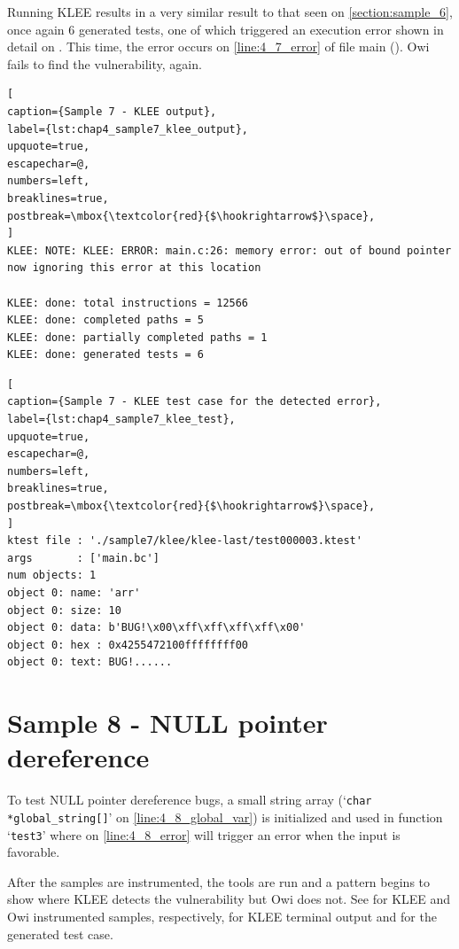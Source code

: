 Running KLEE results in a very similar result to that seen on \cref{section:sample_6}, once again 6 generated tests, one of which triggered an execution error shown in detail on . This time, the error occurs on \cref{line:4_7_error} of file main ().
Owi fails to find the vulnerability, again.

\begin{lstlisting}[
caption={Sample 7 - KLEE output},
label={lst:chap4_sample7_klee_output},
upquote=true,
escapechar=@,
numbers=left,
breaklines=true,
postbreak=\mbox{\textcolor{red}{$\hookrightarrow$}\space},
]
KLEE: NOTE: KLEE: ERROR: main.c:26: memory error: out of bound pointer
now ignoring this error at this location

KLEE: done: total instructions = 12566
KLEE: done: completed paths = 5
KLEE: done: partially completed paths = 1
KLEE: done: generated tests = 6
\end{lstlisting}

\begin{lstlisting}[
caption={Sample 7 - KLEE test case for the detected error},
label={lst:chap4_sample7_klee_test},
upquote=true,
escapechar=@,
numbers=left,
breaklines=true,
postbreak=\mbox{\textcolor{red}{$\hookrightarrow$}\space},
]
ktest file : './sample7/klee/klee-last/test000003.ktest'
args       : ['main.bc']
num objects: 1
object 0: name: 'arr'
object 0: size: 10
object 0: data: b'BUG!\x00\xff\xff\xff\xff\x00'
object 0: hex : 0x4255472100ffffffff00
object 0: text: BUG!......
\end{lstlisting}



\section{Sample 8 - NULL pointer dereference}\label{section:sample_8}

To test NULL pointer dereference bugs, a small string array (`\lstinline$char *global_string[]$' on \cref{line:4_8_global_var}) is initialized and used in function `\lstinline$test3$' where on \cref{line:4_8_error} will trigger an error when the input is favorable.

After the samples are instrumented, the tools are run and a pattern begins to show where KLEE detects the vulnerability but Owi does not. See  for KLEE and Owi instrumented samples, respectively,  for KLEE terminal output and  for the generated test case.


